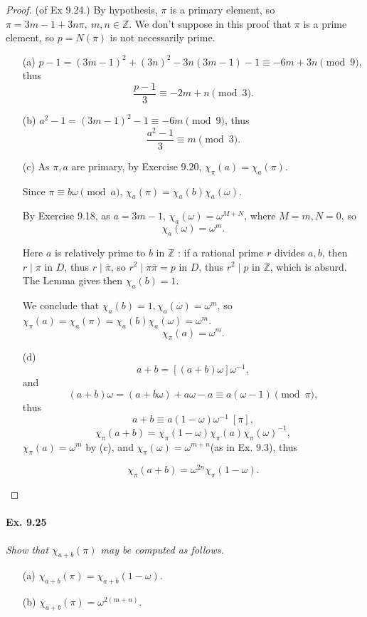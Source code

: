 \documentclass[11pt,a4paper]{article}
\newcommand{\Z}{\mathbb{Z}}
\begin{document}
\begin{proof}(of Ex 9.24.)
By hypothesis, $\pi$ is a primary element, so $\pi = 3m-1 + 3n \pi,\ m,n\in \Z$.
We don't suppose in this proof that $\pi$ is a prime element, so $p = N(\pi)$ is not necessarily prime. 
 \begin{enumerate}
\item[(a)]$p-1 = (3m-1)^2+(3n)^2-3n(3m-1) - 1 \equiv -6m + 3n \pmod 9$, thus $$\frac{p-1}{3} \equiv -2m + n \pmod 3.$$
\item[(b)]$a^2 - 1 = (3m-1)^2-1 \equiv -6m \pmod 9$, thus
$$\frac{a^2-1}{3} \equiv m \pmod 3.$$
\item[(c)]  
 As $\pi,a$ are primary, by Exercise 9.20, $\chi_\pi(a) = \chi_a(\pi)$.

Since $\pi \equiv b\omega \pmod a$, $\chi_a(\pi) = \chi_a(b) \chi_a(\omega)$.

By Exercise 9.18,  as $a = 3m-1$, $\chi_a(\omega) = \omega^{M+N}$, where $M = m, N = 0$, so $$\chi_a(\omega) = \omega^m.$$

Here $a$ is relatively prime to $b$ in $\Z$ : if a rational prime $r$ divides $a,b$, then $r \mid \pi$ in $D$, thus $r \mid \overline{\pi}$, so $r^2 \mid \pi \overline{\pi} = p$ in $D$, thus $r^2 \mid p$ in $\Z$, which is absurd. The Lemma gives then $\chi_a(b) = 1$.

 We conclude that $\chi_a(b) = 1,\chi_a(\omega) = \omega^m$, so $\chi_\pi(a) = \chi_a(\pi) = \chi_a(b) \chi_a(\omega) = \omega^m$.
 $$\chi_\pi(a) = \omega^m.$$
 
 \item[(d)] 
 $$a+b = [(a+b) \omega] \omega^{-1},$$
and 
$$(a+b) \omega = (a+b\omega) +a\omega -a \equiv a(\omega-1)\pmod \pi,$$ thus
$$a+b \equiv a(1-\omega) \omega^{-1} \ [\pi],$$
$$\chi_\pi (a+b) = \chi_\pi(1-\omega) \chi_\pi(a) \chi_\pi(\omega)^{-1},$$
$\chi_\pi(a) = \omega^m$ by (c), and $\chi_\pi(\omega) = \omega^{m+n}$(as in Ex. 9.3), thus

$$\chi_\pi(a+b) = \omega^{2n} \chi_\pi(1-\omega).$$

\end{enumerate}
\end{proof}

\paragraph{Ex. 9.25}

{\it Show that $\chi_{a+b}(\pi)$ may be computed as follows.
\begin{enumerate}
\item[(a)] $\chi_{a+b}(\pi) = \chi_{a+b}(1-\omega)$.
\item[(b)] $\chi_{a+b}(\pi) = \omega^{2(m+n)}$.
\end{enumerate}
}
\end{document}
